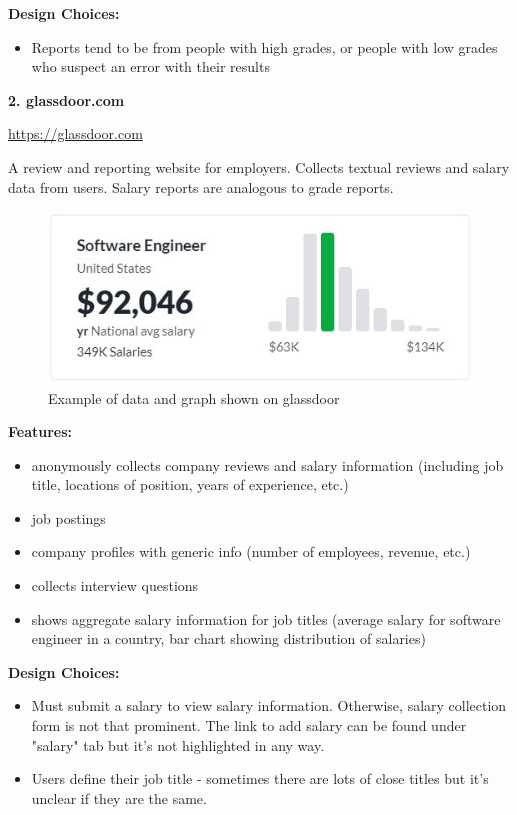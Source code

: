 \documentclass{article}
\begin{document}
\noindent \textbf{Design Choices:}
\begin{itemize}
\item Reports tend to be from people with high grades, or people with low grades who suspect an error with their results
\end{itemize}
\medskip

\noindent \textbf{2. glassdoor.com}

\noindent \url{https://glassdoor.com}
\bigskip

\noindent A review and reporting website for employers. Collects textual reviews and salary data from users. Salary reports are analogous to grade reports.
\bigskip

\begin{figure}[h]
\noindent \includegraphics{glassdoor1}
\centering
\caption{Example of data and graph shown on glassdoor}
\label{fig: glassdoor-data}
\end{figure}

\noindent \textbf{Features:}
\begin{itemize}
\item anonymously collects company reviews and salary information (including job title, locations of position, years of experience, etc.)
\item job postings
\item company profiles with generic info (number of employees, revenue, etc.)
\item collects interview questions
\item shows aggregate salary information for job titles (average salary for software engineer in a country, bar chart showing distribution of salaries)
\end{itemize}
\medskip

\noindent \textbf{Design Choices:}
\begin{itemize}
\item Must submit a salary to view salary information. Otherwise, salary collection form is not that prominent. The link to add salary can be found under "salary" tab but it's not highlighted in any way.
\item Users define their job title - sometimes there are lots of close titles but it's unclear if they are the same.
\end{itemize}
\medskip
\end{document}
